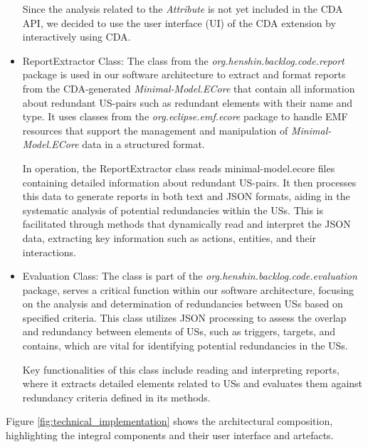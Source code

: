 \begin{itemize}
	Since the analysis related to the \textit{Attribute} is not yet included in the CDA API, we decided to use the user interface (UI) of the CDA extension by interactively using CDA.
	
	\item ReportExtractor Class: The class from the \textit{org.henshin.backlog.code.report} package is used in our software architecture to extract and format reports from the CDA-generated \textit{Minimal-Model.ECore} that contain all information about redundant US-pairs such as redundant elements with their name and type. It uses classes from the \textit{org.eclipse.emf.ecore} package to handle EMF resources that support the management and manipulation of \textit{Minimal-Model.ECore} data in a structured format.
	
	In operation, the ReportExtractor class reads minimal-model.ecore files containing detailed information about redundant US-pairs. It then processes this data to generate reports in both text and JSON formats, aiding in the systematic analysis of potential redundancies within the USs. This is facilitated through methods that dynamically read and interpret the JSON data, extracting key information such as actions, entities, and their interactions.
	
	\item Evaluation Class: The class is part of the \textit{org.henshin.backlog.code.evaluation} package, serves a critical function within our software architecture, focusing on the analysis and determination of redundancies between USs based on specified criteria. This class utilizes JSON processing to assess the overlap and redundancy between elements of USs, such as triggers, targets, and contains, which are vital for identifying potential redundancies in the USs.
	
	Key functionalities of this class include reading and interpreting reports, where it extracts detailed elements related to USs and evaluates them against redundancy criteria defined in its methods. %
	
	\end{itemize}
Figure \ref{fig:technical_implementation} shows the architectural composition, highlighting the integral components and their user interface and artefacts.
